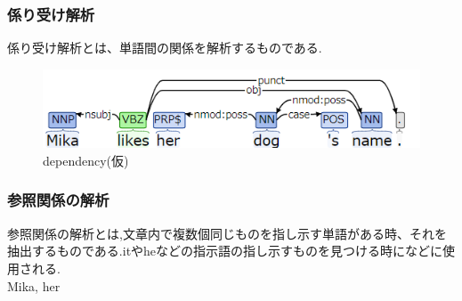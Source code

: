 \documentclass[uplatex,a4j]{jsreport}
\begin{document}
\subsubsection{係り受け解析}
係り受け解析とは、単語間の関係を解析するものである.\\
\begin{figure}[h]
  \centering
  \includegraphics[keepaspectratio, scale=1.0]
       {figure/dependency.png}
  \caption{dependency(仮)}
  \label{dependency}
\end{figure}
\subsubsection{参照関係の解析}
参照関係の解析とは,文章内で複数個同じものを指し示す単語がある時、それを抽出するものである.itやheなどの指示語の指し示すものを見つける時になどに使用される.\\
Mika, her
\end{document}

